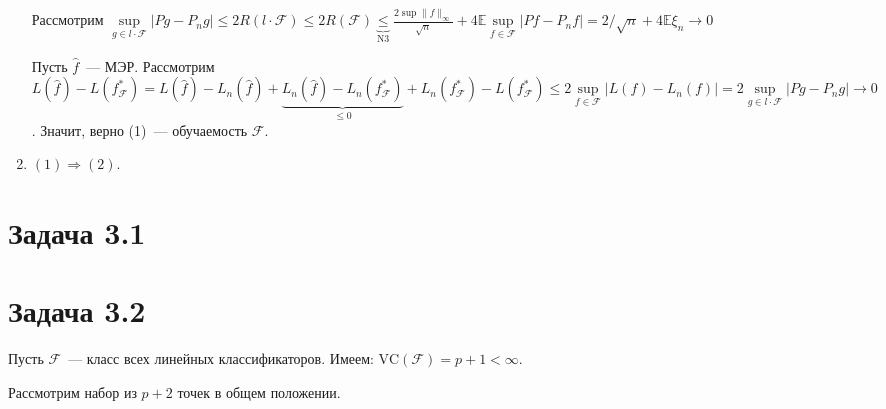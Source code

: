 \documentclass[a4paper]{article}
\newcommand{\VC}{\mbox{VC}}
\newcommand{\F}{\mathcal{F}}
\newcommand{\E}{\mathbb{E}}
\begin{document}
\begin{enumerate}
Рассмотрим $\sup\limits_{g\in l\cdot \F}|Pg-P_ng|\leqslant 2R(l\cdot \F)\leqslant 2R(\F)\underbrace{\leqslant}_{\mbox{N3}}\frac{2\sup\|f\|_\infty}{\sqrt{n}}+4\mathbb{E}\sup\limits_{f\in\F}|Pf-P_nf|=2/\sqrt{n}+4\E \xi_n\to 0$

Пусть $\hat{f}$~--- МЭР. Рассмотрим $L(\hat{f})-L(f^*_\F)=L(\hat{f})-L_n(\hat{f})+\underbrace{L_n(\hat{f})-L_n(f^*_\F)}_{\leqslant 0}+L_n(f^*_\F)-L(f^*_\F)\leqslant 2\sup\limits_{f\in\F}|L(f)-L_n(f)|=2\sup\limits_{g\in l\cdot\F} |Pg-P_ng|\to 0$. Значит, верно (1)~--- обучаемость $\F$.

\item $(1)\Rightarrow(2)$.
\end{enumerate}
\section*{Задача 3.1}

\section*{Задача 3.2}
Пусть $\F$~--- класс всех линейных классификаторов. Имеем: $\VC(\F)=p+1<\infty$.

Рассмотрим набор из $p+2$ точек в общем положении.
\end{document}
